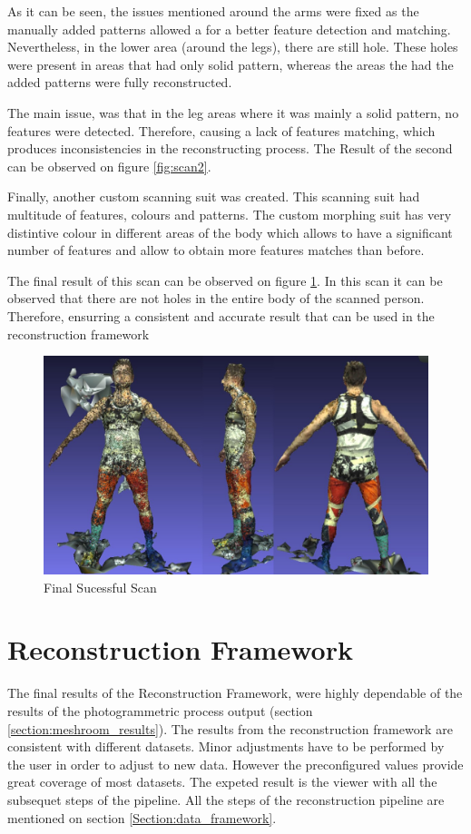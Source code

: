 \documentclass[12pt]{report}
\begin{document}
As it can be seen, the issues mentioned around the arms were fixed as the manually added patterns allowed a for a better feature detection and matching.
Nevertheless, in the lower area (around the legs), there are still hole. These holes were present in areas that had only solid pattern, whereas the areas the had the added patterns were fully reconstructed.
 
The main issue, was that in the leg areas where it was mainly a solid pattern, no features were detected. Therefore, causing a lack of features matching, which produces inconsistencies in the reconstructing process. 
The Result of the second can be observed on figure \ref{fig:scan2}.

Finally, another custom scanning suit was created. This scanning suit had multitude of features, colours and patterns. 
The custom morphing suit has very distintive colour in different areas of the body which allows to have a significant number of features and allow to obtain more features matches than before.

The final result of this scan can be observed on figure \ref{fig:scan3}. In this scan it can be observed that there are not holes in the entire body of the scanned  person. 
Therefore, ensurring a consistent and accurate result that can be used in the reconstruction framework
 
\begin{figure}[H]%
  \centering
 \includegraphics[width=1\textwidth]{scan3.png}
\caption{Final Sucessful Scan}
\label{fig:scan3} 
\end{figure}

\newpage
\section{Reconstruction Framework}
The final results of the Reconstruction Framework, were highly dependable of the results of the photogrammetric process output (section \ref{section:meshroom_results}). 
The results from the reconstruction framework are consistent with different datasets. Minor adjustments have to be performed by the user in order to adjust to new data. 
However the preconfigured values provide great coverage of most datasets. 
The expeted result is the viewer with all the subsequet steps of the pipeline. All the steps of the reconstruction pipeline are mentioned on section \ref{Section:data_framework}.
\end{document}

